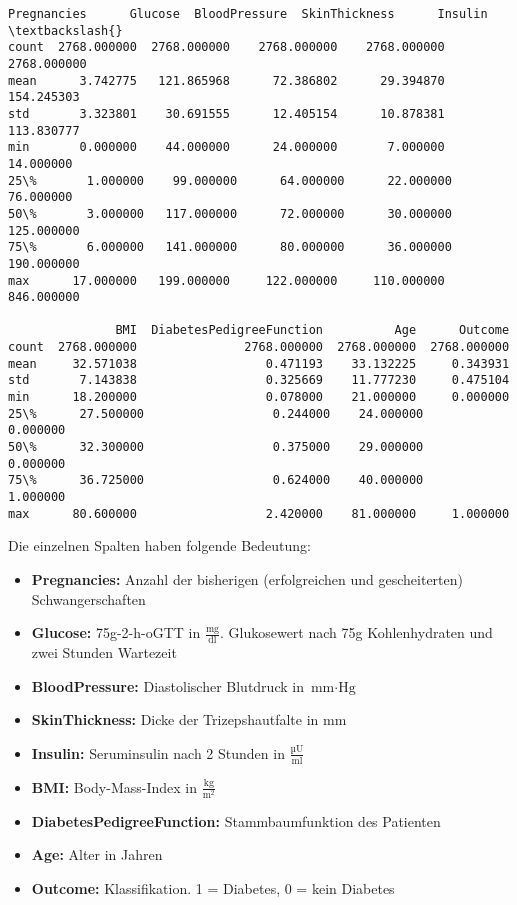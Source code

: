 \documentclass[11.5pt]{article}
\makeatletter
\providecommand{\tightlist}{%
  \setlength{\itemsep}{0pt}\setlength{\parskip}{0pt}}
\newcommand{\boxspacing}{\kern\kvtcb@left@rule\kern\kvtcb@boxsep}
\newcommand{\prompt}[4]{
        {\ttfamily\llap{{\color{#2}[#3]:\hspace{3pt}#4}}\vspace{-\baselineskip}}
    }
\makeatother
\begin{document}
            \begin{tcolorbox}[breakable, size=fbox, boxrule=.5pt, pad at break*=1mm, opacityfill=0]
\prompt{Out}{outcolor}{5}{\boxspacing}
\begin{Verbatim}[commandchars=\\\{\}]
       Pregnancies      Glucose  BloodPressure  SkinThickness      Insulin  \textbackslash{}
count  2768.000000  2768.000000    2768.000000    2768.000000  2768.000000
mean      3.742775   121.865968      72.386802      29.394870   154.245303
std       3.323801    30.691555      12.405154      10.878381   113.830777
min       0.000000    44.000000      24.000000       7.000000    14.000000
25\%       1.000000    99.000000      64.000000      22.000000    76.000000
50\%       3.000000   117.000000      72.000000      30.000000   125.000000
75\%       6.000000   141.000000      80.000000      36.000000   190.000000
max      17.000000   199.000000     122.000000     110.000000   846.000000

               BMI  DiabetesPedigreeFunction          Age      Outcome
count  2768.000000               2768.000000  2768.000000  2768.000000
mean     32.571038                  0.471193    33.132225     0.343931
std       7.143838                  0.325669    11.777230     0.475104
min      18.200000                  0.078000    21.000000     0.000000
25\%      27.500000                  0.244000    24.000000     0.000000
50\%      32.300000                  0.375000    29.000000     0.000000
75\%      36.725000                  0.624000    40.000000     1.000000
max      80.600000                  2.420000    81.000000     1.000000
\end{Verbatim}
\end{tcolorbox}
        
    Die einzelnen Spalten haben folgende Bedeutung:

\begin{itemize}
\tightlist
\item
  \textbf{Pregnancies:} Anzahl der bisherigen (erfolgreichen und
  gescheiterten) Schwangerschaften
\item
  \textbf{Glucose:} 75g-2-h-oGTT in \(\frac{\text{mg}}{\text{dl}}\).
  Glukosewert nach 75g Kohlenhydraten und zwei Stunden Wartezeit
\item
  \textbf{BloodPressure:} Diastolischer Blutdruck in
  \(\text{mm} \cdot \text{Hg}\)
\item
  \textbf{SkinThickness:} Dicke der Trizepshautfalte in \(\text{mm}\)
\item
  \textbf{Insulin:} Seruminsulin nach 2 Stunden in
  \(\frac{\text{µU}}{\text{ml}}\)
\item
  \textbf{BMI:} Body-Mass-Index in \(\frac{\text{kg}}{\text{m}^2}\)
\item
  \textbf{DiabetesPedigreeFunction:} Stammbaumfunktion des Patienten
\item
  \textbf{Age:} Alter in Jahren
\item
  \textbf{Outcome:} Klassifikation. 1 = Diabetes, 0 = kein Diabetes
\end{itemize}
\end{document}
